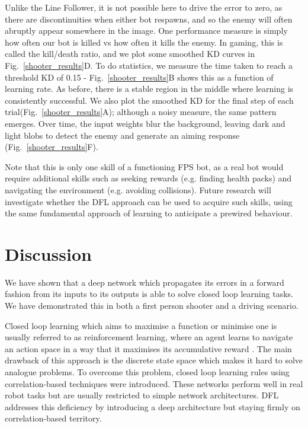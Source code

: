 \documentclass{aamas2017}
\begin{document}
Unlike the Line Follower, it is not possible here to drive the error
to zero, as there are discontinuities when either bot respawns, and so
the enemy will often abruptly appear somewhere in the image. One
performance measure is simply how often our bot is killed vs how often
it kills the enemy. In gaming, this is called the kill/death ratio,
and we plot some smoothed KD curves in Fig.~\ref{shooter_results}D. To
do statistics, we measure the time taken to reach a threshold KD of 0.15 -
Fig.~\ref{shooter_results}B shows this as a function of learning
rate. As before, there is a stable region in the middle where learning
is consistently successful. We also plot the smoothed KD for the final
step of each trial(Fig.~\ref{shooter_results}A); although a noisy
measure, the same pattern emerges. Over time, the input weights blur
the background, leaving dark and light blobs to detect the enemy and
generate an aiming response (Fig.~\ref{shooter_results}F).

Note that this is only one skill of a functioning FPS bot, as a real bot would
require additional skills such as seeking rewards (e.g. finding health packs) and
navigating the environment (e.g. avoiding collisions). Future research
will investigate whether the DFL approach can be used to acquire such
skills, using the same fundamental approach of learning to anticipate
a prewired behaviour.


\section{Discussion}
We have shown that a deep network which propagates its errors in a forward
fashion from its inputs to its outputs is able to solve closed loop
learning tasks. We have demonstrated this in both a first person
shooter and a driving scenario.

Closed loop learning which aims to maximise a function or minimise one
is usually referred to as reinforcement learning, where an agent learns to
navigate an action space in a way that it maximises its accumulative
reward \cite{Dayan1992}. The main drawback of this approach
is the discrete state space which makes it hard to solve analogue
problems. To overcome this problem, closed loop learning rules using
correlation-based techniques \cite{Verschure91} were introduced.
These networks perform well in real robot tasks but are usually restricted to 
simple network architectures. DFL addresses this
deficiency by introducing a deep architecture but staying firmly
on correlation-based territory.
\end{document}
